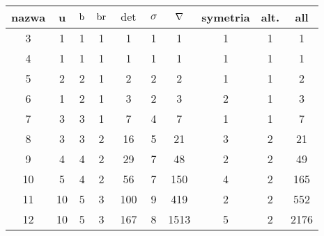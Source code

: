 
\renewcommand*{\arraystretch}{1.4}
\footnotesize
\begin{longtable}{cccccccccc}
\hline
nazwa & u & $\operatorname{b}$ & $\operatorname{br}$ & $\det$ & $\sigma$ & $\nabla$ & symetria & alt. & all \\ \hline
\endhead %
3 & 1 & 1 & 1 & 1 & 1 & 1 & 1 & 1 & 1 \\
4 & 1 & 1 & 1 & 1 & 1 & 1 & 1 & 1 & 1 \\
5 & 2 & 2 & 1 & 2 & 2 & 2 & 1 & 1 & 2 \\
6 & 1 & 2 & 1 & 3 & 2 & 3 & 2 & 1 & 3 \\
7 & 3 & 3 & 1 & 7 & 4 & 7 & 1 & 1 & 7 \\
8 & 3 & 3 & 2 & 16 & 5 & 21 & 3 & 2 & 21 \\
9 & 4 & 4 & 2 & 29 & 7 & 48 & 2 & 2 & 49 \\
10 & 5 & 4 & 2 & 56 & 7 & 150 & 4 & 2 & 165 \\
11 & 10 & 5 & 3 & 100 & 9 & 419 & 2 & 2 & 552 \\
12 & 10 & 5 & 3 & 167 & 8 & 1513 & 5 & 2 & 2176 \\
\hline
\end{longtable}
\normalsize

